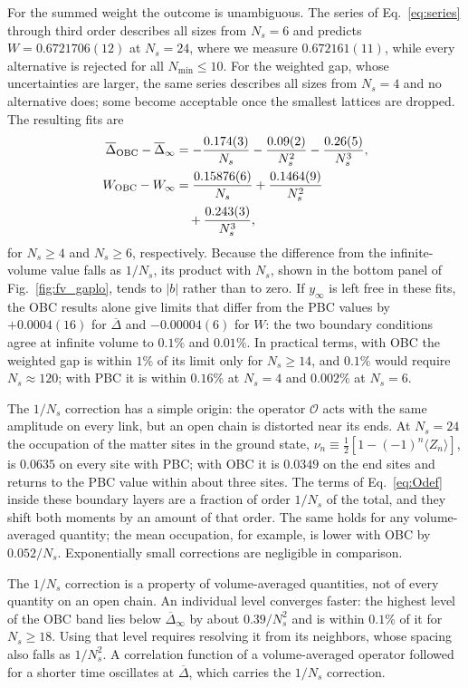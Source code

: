 \documentclass[twocolumn,superscriptaddress,showpacs,nofootinbib,notitlepage,preprintnumbers,secnumarabic,amssymb, floatfix, nobibnotes, aps, prd]{revtex4-2}
\begin{document}
For the summed weight the outcome is unambiguous.
The series of Eq.~\eqref{eq:series} through third order describes all sizes from $N_s=6$ and predicts $W=0.6721706(12)$ at $N_s=24$, where we measure $0.672161(11)$, while every alternative is rejected for all $N_{\min}\le10$.
For the weighted gap, whose uncertainties are larger, the same series describes all sizes from $N_s=4$ and no alternative does; some become acceptable once the smallest lattices are dropped.
The resulting fits are
\begin{align}
\label{eq:dbarfit}
   \overline{\Delta}_{\rm OBC}-\overline{\Delta}_\infty &= -\frac{0.174(3)}{N_s}-\frac{0.09(2)}{N_s^2}-\frac{0.26(5)}{N_s^3},\\
\label{eq:wfit}
   W_{\rm OBC}-W_\infty &= \frac{0.15876(6)}{N_s}+\frac{0.1464(9)}{N_s^2}\nonumber\\
   &\quad+\frac{0.243(3)}{N_s^3},
\end{align}
for $N_s\ge4$ and $N_s\ge6$, respectively.
Because the difference from the infinite-volume value falls as $1/N_s$, its product with $N_s$, shown in the bottom panel of Fig.~\ref{fig:fv_gaplo}, tends to $|b|$ rather than to zero.
If $y_\infty$ is left free in these fits, the OBC results alone give limits that differ from the PBC values by $+0.0004(16)$ for $\overline{\Delta}$ and $-0.00004(6)$ for $W$: the two boundary conditions agree at infinite volume to $0.1\%$ and $0.01\%$.
In practical terms, with OBC the weighted gap is within $1\%$ of its limit only for $N_s\ge14$, and $0.1\%$ would require $N_s\approx120$; with PBC it is within $0.16\%$ at $N_s=4$ and $0.002\%$ at $N_s=6$.

The $1/N_s$ correction has a simple origin: the operator $\mathcal{O}$ acts with the same amplitude on every link, but an open chain is distorted near its ends.
At $N_s=24$ the occupation of the matter sites in the ground state, $\nu_n\equiv\tfrac12\left[1-(-1)^n\langle Z_n\rangle\right]$, is $0.0635$ on every site with PBC; with OBC it is $0.0349$ on the end sites and returns to the PBC value within about three sites.
The terms of Eq.~\eqref{eq:Odef} inside these boundary layers are a fraction of order $1/N_s$ of the total, and they shift both moments by an amount of that order.
The same holds for any volume-averaged quantity; the mean occupation, for example, is lower with OBC by $0.052/N_s$.
Exponentially small corrections are negligible in comparison.

The $1/N_s$ correction is a property of volume-averaged quantities, not of every quantity on an open chain.
An individual level converges faster: the highest level of the OBC band lies below $\overline{\Delta}_\infty$ by about $0.39/N_s^2$ and is within $0.1\%$ of it for $N_s\ge18$.
Using that level requires resolving it from its neighbors, whose spacing also falls as $1/N_s^2$.
A correlation function of a volume-averaged operator followed for a shorter time oscillates at $\overline{\Delta}$, which carries the $1/N_s$ correction.
\end{document}
